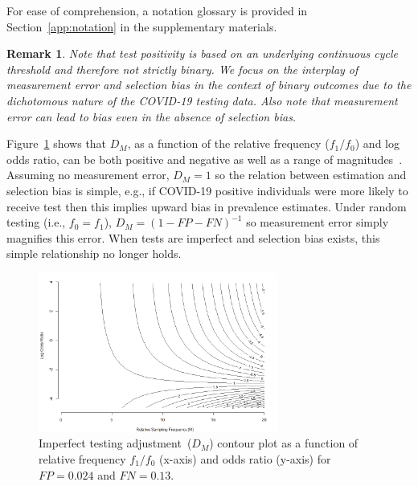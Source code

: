 \documentclass[11pt]{amsart}
\numberwithin{equation}{section}
\theoremstyle{plain}
\newtheorem{remark}{Remark}
\begin{document}
 For ease of comprehension, a notation glossary is provided in Section~\ref{app:notation} in the supplementary materials.
 \vspace{-0.25cm}
 \begin{remark}
 \label{rmk:testbinary}
 Note that test positivity is based on an underlying continuous cycle threshold and therefore not strictly binary.  We focus on the interplay of measurement error and selection bias in the context of binary outcomes due to the dichotomous nature of the COVID-19 testing data.  Also note that measurement error can lead to bias even in the absence of selection bias.
 \end{remark}
 \vspace{-0.25cm}
 Figure~\ref{fig:heatmap} shows that $D_M$, as a function of the relative frequency ($f_1/f_0$) and log odds ratio, can be both positive and negative as well as a range of magnitudes~\citep{Beesley2020,Beesley2019,Smeden2019}. Assuming no measurement error, $D_M = 1$ so the relation between estimation and selection bias is simple, e.g., if COVID-19 positive individuals were more likely to receive test then this implies upward bias in prevalence estimates. Under random testing (i.e., $f_0 = f_1$), $D_M = (1-FP-FN)^{-1}$ so measurement error simply magnifies this error. When tests are imperfect and selection bias exists, this simple relationship no longer holds.

 \begin{figure}[!th]
 \centering
 \includegraphics[width = 0.7\textwidth]{../figs/mem_heatmap.png}
 \caption{Imperfect testing adjustment~($D_M$) contour plot as a function of relative frequency $f_1/f_0$ (x-axis) and odds ratio (y-axis) for $FP=0.024$ and $FN=0.13$.}
 \label{fig:heatmap}
 \vspace{-0.3cm}
 \end{figure}
\end{document}
